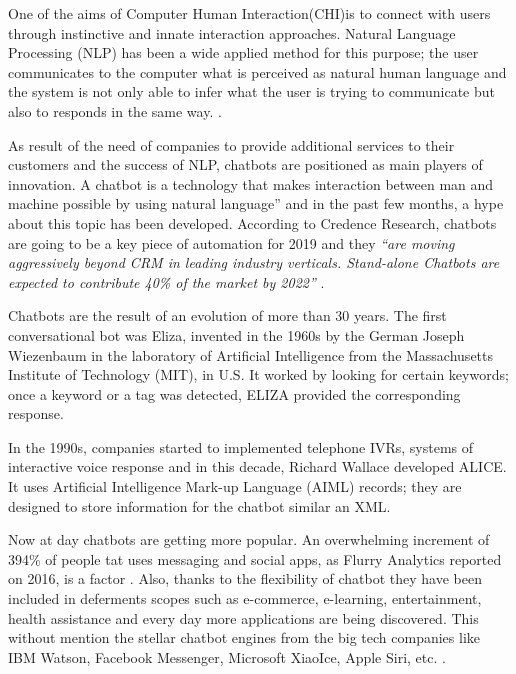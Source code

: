 \documentclass[	DIV=calc,%
							paper=letter,%
							fontsize=12pt%
                            ]{scrartcl}	 					%
\begin{document}
One of the aims of Computer Human Interaction(CHI)is to connect with users through instinctive and innate interaction approaches. Natural Language Processing (NLP) has been a wide applied method for this purpose; the user communicates to the computer what is perceived as natural human language and the system is not only able to infer what the user is trying to communicate but also to responds in the same way. \cite{weizenbaum1966eliza_1529899792}\cite{futrelle2009nlp_05332110}.



As result of the need of companies to provide additional services to their customers and the success of NLP, chatbots are positioned as main players of innovation. A chatbot is a technology that makes interaction between man and machine possible by using natural language” and in the past few months, a hype about this topic has been developed\cite{LokmanDesigningDiabetic2009_266872926}. According to Credence Research, chatbots are going to be a key piece of automation for 2019 and they \textit{``are moving aggressively beyond CRM in leading industry verticals. Stand-alone Chatbots are expected to contribute 40\% of the market by 2022''} \cite{Newswire_MarketAssessment2017}.

Chatbots are the result of an evolution of more than 30 years. The first conversational bot was Eliza, invented in the 1960s by the German Joseph Wiezenbaum in the laboratory of Artificial Intelligence from the Massachusetts Institute of Technology (MIT), in U.S. It worked by looking for certain keywords; once a keyword or a tag was detected, ELIZA provided the corresponding response. \cite{ io2017chatbots_08289883}
 
In the 1990s, companies started to implemented telephone IVRs, systems of interactive voice response and in this decade, Richard Wallace developed ALICE. It uses Artificial Intelligence Mark-up Language (AIML) records; they are designed to store information for the chatbot similar an XML.\cite{ wallace2008alice_sn}

Now at day chatbots are getting more popular. An overwhelming increment of 394\% of people tat uses messaging and social apps, as Flurry Analytics reported on 2016, is a factor \cite{khalaf2017their_sn}. Also, thanks to the flexibility of chatbot they have been included in deferments scopes such as e-commerce, e-learning, entertainment, health assistance and every day more applications are being discovered. This without mention the stellar chatbot engines from the big tech companies like IBM Watson, Facebook Messenger, Microsoft XiaoIce, Apple Siri, etc. \cite{ io2017chatbots_08289883}.
\end{document}
